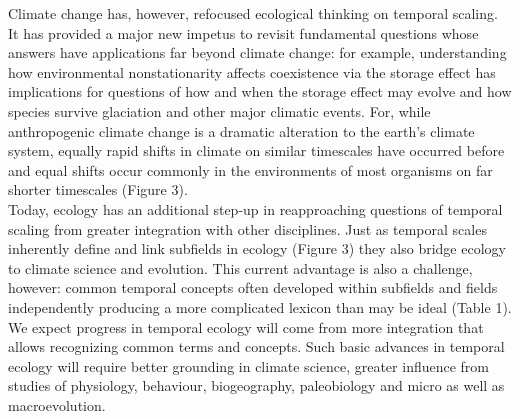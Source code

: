 \documentclass[11pt,a4paper,oneside]{article}
\begin{document}
Climate change has, however, refocused ecological thinking on temporal scaling. It has provided a major new impetus to revisit fundamental questions whose answers have applications far beyond climate change: for example, understanding how environmental nonstationarity affects coexistence via the storage effect has implications for questions of how and when the storage effect may evolve and how species survive glaciation and other major climatic events. For, while anthropogenic climate change is a dramatic alteration to the earth's climate system, equally rapid shifts in climate on similar timescales have occurred before and equal shifts occur commonly in the environments of most organisms on far shorter timescales (Figure 3).\\

Today, ecology has an additional step-up in reapproaching questions of temporal scaling from greater integration with other disciplines. Just as temporal scales inherently define and link subfields in ecology (Figure 3) they also bridge ecology to climate science and evolution. This current advantage is also a challenge, however: common temporal concepts often developed within subfields and fields independently producing a more complicated lexicon than may be ideal (Table 1). We expect progress in temporal ecology will come from more integration that allows recognizing common terms and concepts. Such basic advances in temporal ecology will require better grounding in climate science, greater influence from studies of physiology, behaviour, biogeography, paleobiology and micro as well as macroevolution. \\ %

\\
\end{document}
